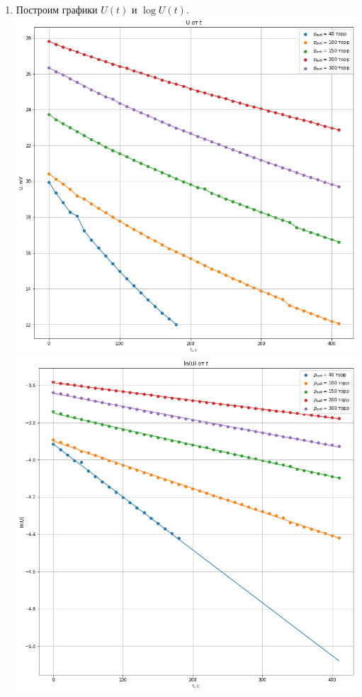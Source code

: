 \documentclass[12pt,a4paper]{article}
\begin{document}
\begin{enumerate}
		\item Построим графики $U(t)$ и $\log{U}(t)$. \\
			\includegraphics[scale=0.5]{ut.png} \\
			\includegraphics[scale=0.5]{lnut.png}
			

\end{enumerate}
\end{document}
